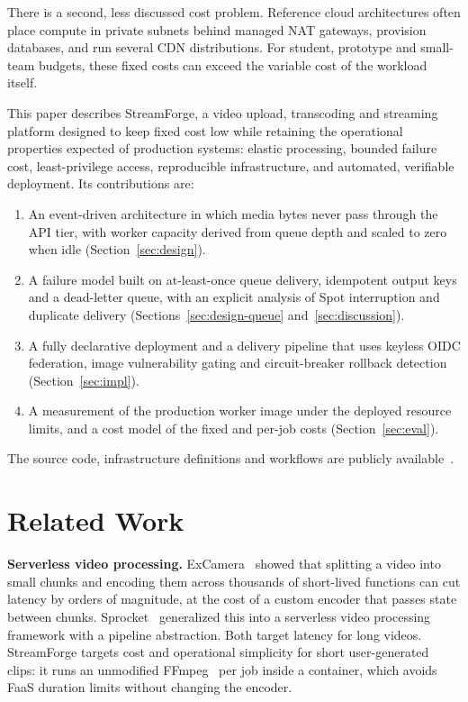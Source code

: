 \documentclass[conference]{IEEEtran}
\begin{document}
There is a second, less discussed cost problem. Reference cloud architectures often place compute in private subnets behind managed NAT gateways, provision databases, and run several CDN distributions. For student, prototype and small-team budgets, these fixed costs can exceed the variable cost of the workload itself.

This paper describes StreamForge, a video upload, transcoding and streaming platform designed to keep fixed cost low while retaining the operational properties expected of production systems: elastic processing, bounded failure cost, least-privilege access, reproducible infrastructure, and automated, verifiable deployment. Its contributions are:
\begin{enumerate}
  \item An event-driven architecture in which media bytes never pass through the API tier, with worker capacity derived from queue depth and scaled to zero when idle (Section~\ref{sec:design}).
  \item A failure model built on at-least-once queue delivery, idempotent output keys and a dead-letter queue, with an explicit analysis of Spot interruption and duplicate delivery (Sections~\ref{sec:design-queue} and~\ref{sec:discussion}).
  \item A fully declarative deployment and a delivery pipeline that uses keyless OIDC federation, image vulnerability gating and circuit-breaker rollback detection (Section~\ref{sec:impl}).
  \item A measurement of the production worker image under the deployed resource limits, and a cost model of the fixed and per-job costs (Section~\ref{sec:eval}).
\end{enumerate}
The source code, infrastructure definitions and workflows are publicly available~\cite{streamforge_repo}.

\section{Related Work}
\textbf{Serverless video processing.} ExCamera~\cite{fouladi2017excamera} showed that splitting a video into small chunks and encoding them across thousands of short-lived functions can cut latency by orders of magnitude, at the cost of a custom encoder that passes state between chunks. Sprocket~\cite{ao2018sprocket} generalized this into a serverless video processing framework with a pipeline abstraction. Both target latency for long videos. StreamForge targets cost and operational simplicity for short user-generated clips: it runs an unmodified FFmpeg~\cite{ffmpeg} per job inside a container, which avoids FaaS duration limits without changing the encoder.
\end{document}

